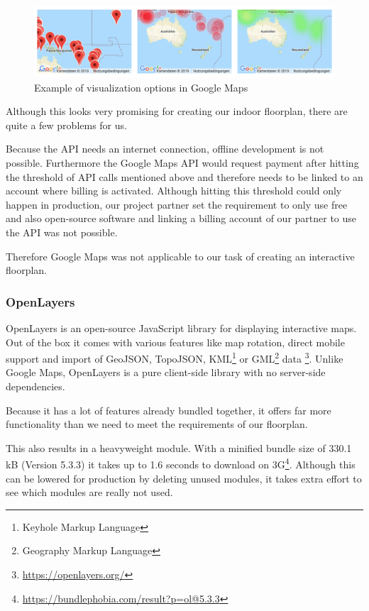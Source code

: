 \begin{figure}[!hb]
	\centering
	\includegraphics[width=1\linewidth]{images/GoogleMapsHeatmap}
	\caption{Example of visualization options in Google Maps}
	\label{fig:GoogleMapsHeatmap}
\end{figure}

Although this looks very promising for creating our indoor floorplan, there are quite a few problems for us.

Because the API needs an internet connection, offline development is not possible. 
Furthermore the Google Maps API would request payment after hitting the threshold of API calls mentioned above and therefore needs to be linked to an account where billing is activated. Although hitting this threshold could only happen in production, our project partner set the requirement to only use free and also open-source software and linking a billing account of our partner to use the API was not possible. 

Therefore Google Maps was not applicable to our task of creating an interactive floorplan.

\subsubsection{OpenLayers}
\label{OpenLayers}

OpenLayers is an open-source JavaScript library for displaying interactive maps. Out of the box it comes with various features like map rotation, direct mobile support and import of GeoJSON, TopoJSON, KML\footnote{Keyhole Markup Language} or GML\footnote{Geography Markup Language} data \footnote{\url{https://openlayers.org/}}. Unlike Google Maps, OpenLayers is a pure client-side library with no server-side dependencies. 

Because it has a lot of features already bundled together, it offers far more functionality than we need to meet the requirements of our floorplan. 

This also results in a heavyweight module. With a minified bundle size of 330.1 kB (Version 5.3.3) it takes up to 1.6 seconds to download on 3G\footnote{\url{https://bundlephobia.com/result?p=ol@5.3.3}}. Although this can be lowered for production by deleting unused modules, it takes extra effort to see which modules are really not used.

